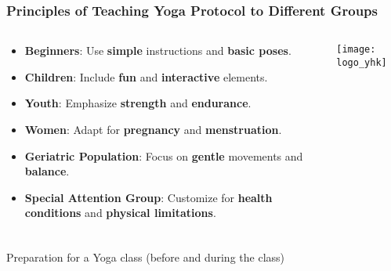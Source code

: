 \begin{frame}[fragile]\frametitle{Principles of Teaching Yoga Protocol to Different Groups}
\begin{columns}
    \begin{column}[T]{0.5\linewidth}
      \begin{itemize}
        \item \textbf{Beginners}: Use \textbf{simple} instructions and \textbf{basic poses}.
        \item \textbf{Children}: Include \textbf{fun} and \textbf{interactive} elements.
        \item \textbf{Youth}: Emphasize \textbf{strength} and \textbf{endurance}.
        \item \textbf{Women}: Adapt for \textbf{pregnancy} and \textbf{menstruation}.
        \item \textbf{Geriatric Population}: Focus on \textbf{gentle} movements and \textbf{balance}.
        \item \textbf{Special Attention Group}: Customize for \textbf{health conditions} and \textbf{physical limitations}.
      \end{itemize}
    \end{column}
    \begin{column}[T]{0.5\linewidth}
        \begin{center}
        \texttt{[image: logo\_yhk]}
        \end{center}	
    \end{column}
\end{columns}
\end{frame}


\begin{frame}[fragile]\frametitle{}
\begin{center}
{\Large Preparation for a Yoga class (before and during the class)}
\end{center}
\end{frame}

